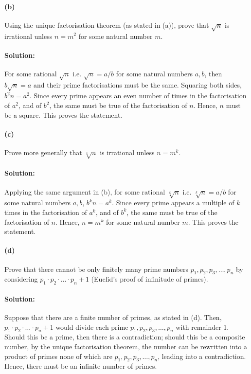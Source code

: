 \documentclass{article}
\begin{document}
\paragraph{(b)} Using the unique factorisation theorem (as
stated in (a)), prove that $\sqrt{n}$ is irrational unless $n = m^2$ for some
natural number $m$.

\paragraph{Solution:} For some rational $\sqrt{n}$ i.e. $\sqrt{n} = a/b$
for some natural numbers $a, b$, then $b\sqrt{n} = a$ and their prime
factorisations must be the same. Squaring both sides, $b^2n = a^2$. Since every
prime appears an even number of times in the factorisation of $a^2$, and of
$b^2$, the same must be true of the factorisation of $n$. Hence, $n$ must be a
square. This proves the statement.

\paragraph{(c)} Prove more generally that $\sqrt[k]{n}$ is
irrational unless $n = m^k$.

\paragraph{Solution:} Applying the same argument in (b), for some rational
$\sqrt[k]{n}$ i.e. $\sqrt[k]{n} = a/b$ for some natural numbers $a, b$, $b^kn =
a^k$. Since every prime appears a multiple of $k$ times in the factorisation of
$a^k$, and of $b^k$, the same must be true of the factorisation of $n$. Hence,
$n = m^k$ for some natural number $m$. This proves the statement.

\paragraph{(d)} Prove that there cannot be only finitely
many prime numbers $p_1, p_2, p_3, \ldots, p_n$ by considering $p_1 \cdot p_2
\cdot \ldots \cdot p_n + 1$ (Euclid's proof of infinitude of primes).

\paragraph{Solution:} Suppose that there are a finite number of primes, as
stated in (d). Then, $p_1 \cdot p_2 \cdot \ldots \cdot p_n + 1$ would divide
each prime $p_1, p_2, p_3, \ldots, p_n$ with remainder 1. Should this be a
prime, then there is a contradiction; should this be a composite number, by the
unique factorisation theorem, the number can be rewritten into a product of
primes none of which are $p_1, p_2, p_3, \ldots, p_n$, leading into a
contradiction. Hence, there must be an infinite number of primes.
\end{document}
